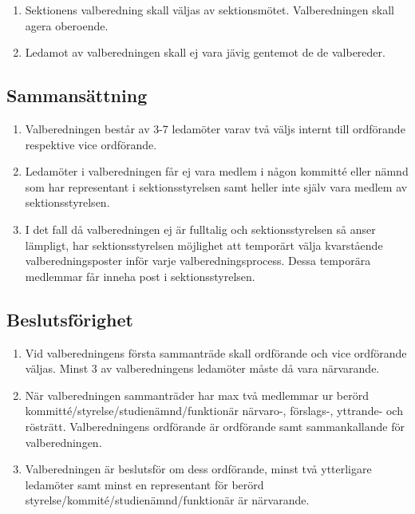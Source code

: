\documentclass[11pt,a4paper]{article}
\begin{document}
\begin{enumerate}[\thesubsection .1]

  \item Sektionens valberedning skall väljas av sektionsmötet. Valberedningen skall agera oberoende.
  
  \item Ledamot av valberedningen skall ej vara jävig gentemot de de valbereder.

\end{enumerate}

\subsection{Sammansättning}

\begin{enumerate}[\thesubsection .1]


  
  \item Valberedningen består av 3-7 ledamöter varav två väljs internt till ordförande respektive vice ordförande.
  
  \item Ledamöter i valberedningen får ej vara medlem i någon kommitté eller nämnd som har representant i sektionsstyrelsen samt heller inte själv vara medlem av sektionsstyrelsen.

\item I det fall då valberedningen ej är fulltalig och sektionsstyrelsen så anser lämpligt, har sektionsstyrelsen möjlighet att temporärt välja kvarstående valberedningsposter inför varje valberedningsprocess. Dessa temporära medlemmar får inneha post i sektionsstyrelsen.
\end{enumerate}

\subsection{Beslutsförighet}

\begin{enumerate}[\thesubsection .1]

\item Vid valberedningens första sammanträde skall ordförande och vice ordförande väljas. Minst 3 av valberedningens ledamöter måste då vara närvarande.

  \item När valberedningen sammanträder har max två medlemmar ur berörd kommitté/\-styrelse/studienämnd/funktionär närvaro-, för\-slags-, yttrande- och rösträtt. Valberedningens  ord\-för\-ande är ordförande samt sammankallande för valberedningen.

  \item Valberedningen är beslutsför om dess ordförande, minst två ytterligare ledamöter samt minst en representant för berörd styrelse/\-kommité/\-studienämnd/\-funktionär är närvarande.

\end{enumerate}
\end{document}

